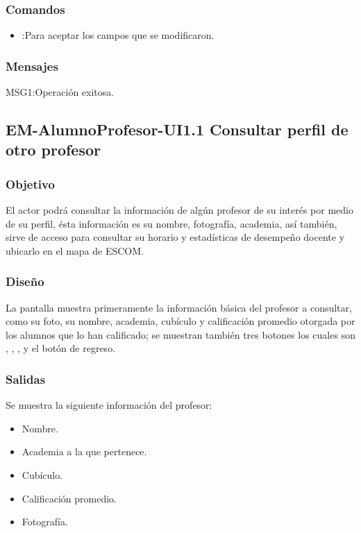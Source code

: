 \subsubsection{Comandos}
\begin{itemize}
	\item {} :Para aceptar los campos que se modificaron.
\end{itemize}

\subsubsection{Mensajes}
\begin{Citemize}
	\item MSG1:Operación exitosa.
\end{Citemize}

\subsection{EM-AlumnoProfesor-UI1.1 Consultar perfil de otro profesor}

\subsubsection{Objetivo}
	\noindent
	El actor podrá consultar la información de algún profesor de su interés por medio de su perfil, ésta información es su nombre, fotografía, academia, así también, sirve de acceso para consultar su horario y estadísticas de desempeño docente y ubicarlo en el mapa de ESCOM.


\subsubsection{Diseño}
	\noindent
	La pantalla muestra primeramente la información básica del profesor a consultar, como su foto, su nombre, academia, cubículo y calificación promedio otorgada por los alumnos que lo han calificado; se muestran también tres botones los cuales son , , ,  y el botón de regreso.


\subsubsection{Salidas}
	\noindent
	Se muestra la siguiente información del profesor:
	\begin{itemize}
		\item Nombre.
		\item Academia a la que pertenece.
		\item Cubículo.
		\item Calificación promedio.
		\item Fotografía. 
	\end{itemize}

